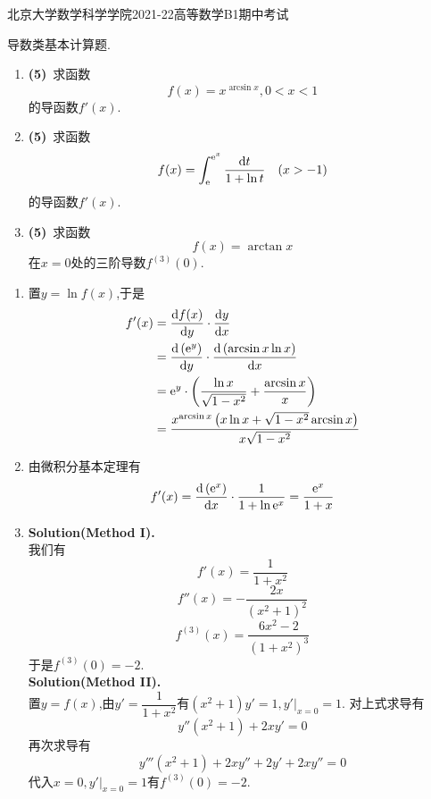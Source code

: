 \documentclass{ctexart}
\begin{document}
\pagestyle{empty}
\begin{center}\Large
    北京大学数学科学学院2021-22高等数学B1期中考试
\end{center}
\begin{problem}[1.(15\songti{分})]
    导数类基本计算题.
    \begin{enumerate}[label=\textbf{(\arabic*)}]
        \item \textbf{(5)}\ 求函数$$f(x)=x^{\arcsin x},0<x<1$$的导函数$f'(x)$.
        \item \textbf{(5)}\ 求函数$$f(x)=\int_{\mathrm{e}}^{\mathrm{e}^x}\dfrac{\mathrm{d} t}{1+\ln t}\quad(x>-1)$$的导函数$f'(x)$.
        \item \textbf{(5)}\ 求函数$$f(x)=\arctan x$$在$x=0$处的三阶导数$f^{(3)}(0)$.
    \end{enumerate}
\end{problem}
\begin{solution}
    \begin{enumerate}[label=\textbf{(\arabic*)}]
        \item 置$y=\ln f(x)$,于是
            $$\begin{aligned}
                f'(x)
                &= \dfrac{\mathrm{d} f(x)}{\mathrm{d} y}\cdot\dfrac{\mathrm{d} y}{\mathrm{d} x} \\
                &= \dfrac{\mathrm{d}\left(\mathrm{e}^y\right)}{\mathrm{d} y}\cdot\dfrac{\mathrm{d}\left(\arcsin x\ln x\right)}{\mathrm{d} x} \\
                &= \mathrm{e}^y\cdot\left(\dfrac{\ln x}{\sqrt{1-x^2}}+\dfrac{\arcsin x}{x}\right) \\
                &= \dfrac{x^{\arcsin x}\left(x\ln x+\sqrt{1-x^2}\arcsin x\right)}{x\sqrt{1-x^2}}
            \end{aligned}$$
        \item 由微积分基本定理有$$f'(x)=\dfrac{\mathrm{d}\left(\mathrm{e}^x\right)}{\mathrm{d} x}\cdot\dfrac{1}{1+\ln\mathrm{e}^x}=\dfrac{\mathrm{e}^x}{1+x}$$
        \item \textbf{Solution(Method I).}\\
            我们有$$f'(x)=\dfrac{1}{1+x^2}$$
            $$f''(x)=-\dfrac{2x}{(x^2+1)^2}$$
            $$f^{(3)}(x)=\dfrac{6x^2-2}{(1+x^2)^3}$$
            于是$f^{(3)}(0)=-2$.\\
            \textbf{Solution(Method II).}\\
            置$y=f(x)$,由$y'=\dfrac{1}{1+x^2}$有$(x^2+1)y'=1,y'|_{x=0}=1$.
            对上式求导有$$y''(x^2+1)+2xy'=0$$
            再次求导有$$y'''(x^2+1)+2xy''+2y'+2xy''=0$$
            代入$x=0,y'|_{x=0}=1$有$f^{(3)}(0)=-2$.
    \end{enumerate}
\end{solution}
\end{document}
